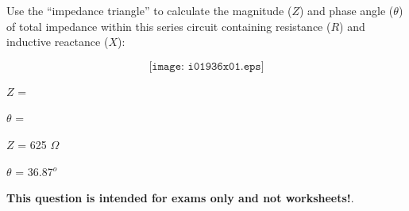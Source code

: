 

Use the ``impedance triangle'' to calculate the magnitude ($Z$) and phase angle ($\theta$) of total impedance within this series circuit containing resistance ($R$) and inductive reactance ($X$):

$$\texttt{[image: i01936x01.eps]}$$

\vskip 20pt

$Z$ =

\vskip 10pt

$\theta$ = 







$Z$ = 625 $\Omega$

\vskip 10pt

$\theta$ = 36.87$^{o}$







{\bf This question is intended for exams only and not worksheets!}.



